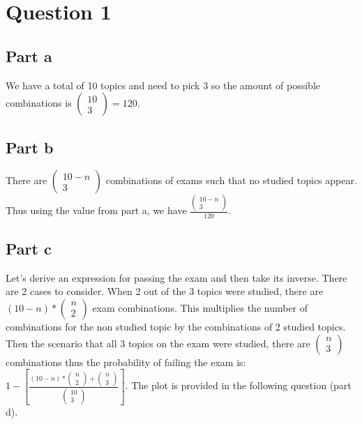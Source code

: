 \documentclass[10pt]{article}
\begin{document}
\section*{Question 1}
\subsection*{Part a}
We have a total of 10 topics and need to pick 3 so the amount of possible combinations
is $\begin{pmatrix} 10 \\ 3 \end{pmatrix} = 120$.


\subsection*{Part b}
There are $\begin{pmatrix} 10 - n \\ 3 \end{pmatrix}$ combinations of exams such that no studied topics
appear. Thus using the value from part a, we have $\frac{\begin{pmatrix} 10 - n \\ 3 \end{pmatrix}}{120}$.


\subsection*{Part c}
Let's derive an expression for passing the exam and then take its inverse. There are 2 cases to consider. When 2 out of the 3 topics were studied, there are $(10 - n) * \begin{pmatrix} n \\ 2 \end{pmatrix}$
exam combinations. This multiplies the number of combinations for the non studied topic by the
combinations of 2 studied topics. Then the scenario that all 3 topics on the exam were studied, there are 
$\begin{pmatrix} n \\ 3 \end{pmatrix}$ combinations thus the probability of failing the exam is: $    1 - [ \frac{(10 - n) * \begin{pmatrix} n \\ 2 \end{pmatrix} + \begin{pmatrix} n \\ 3 \end{pmatrix}}{\begin{pmatrix} 10 \\ 3 \end{pmatrix}}]$.
The plot is provided in the following question (part d).
\end{document}
